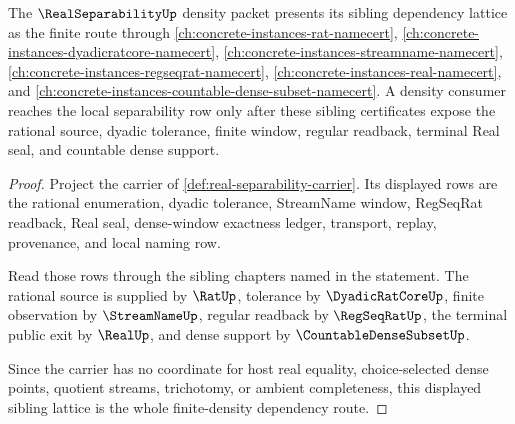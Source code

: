 \begin{theorem}
\label{thm:real-separability-finite-density-lattice}
The $\RealSeparabilityUp$ density packet presents its sibling dependency lattice as the finite route through \autoref{ch:concrete-instances-rat-namecert}, \autoref{ch:concrete-instances-dyadicratcore-namecert}, \autoref{ch:concrete-instances-streamname-namecert}, \autoref{ch:concrete-instances-regseqrat-namecert}, \autoref{ch:concrete-instances-real-namecert}, and \autoref{ch:concrete-instances-countable-dense-subset-namecert}. A density consumer reaches the local separability row only after these sibling certificates expose the rational source, dyadic tolerance, finite window, regular readback, terminal Real seal, and countable dense support.
\end{theorem}
\begin{proof}
Project the carrier of \autoref{def:real-separability-carrier}. Its displayed rows are the rational enumeration, dyadic tolerance, StreamName window, RegSeqRat readback, Real seal, dense-window exactness ledger, transport, replay, provenance, and local naming row.

Read those rows through the sibling chapters named in the statement. The rational source is supplied by $\RatUp$, tolerance by $\DyadicRatCoreUp$, finite observation by $\StreamNameUp$, regular readback by $\RegSeqRatUp$, the terminal public exit by $\RealUp$, and dense support by $\CountableDenseSubsetUp$.

Since the carrier has no coordinate for host real equality, choice-selected dense points, quotient streams, trichotomy, or ambient completeness, this displayed sibling lattice is the whole finite-density dependency route.
\end{proof}
